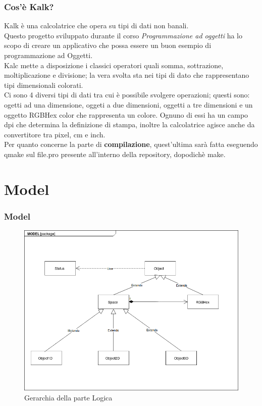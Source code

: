 \documentclass[10pt]{beamer}
\begin{document}
\begin{frame}
\frametitle{Cos'è Kalk?}
Kalk è una calcolatrice che opera su tipi di dati non banali. \\
Questo progetto sviluppato durante il corso \textit{Programmazione ad oggetti} ha lo scopo di creare un applicativo che possa essere un buon esempio di programmazione ad Oggetti. \\
Kalc mette a disposizione i classici operatori quali somma, sottrazione, moltiplicazione e divisione; la vera svolta sta nei tipi di dato che rappresentano tipi dimensionali colorati. \\
Ci sono 4 diversi tipi di dati tra cui è possibile svolgere operazioni; questi sono: ogetti ad una dimensione, oggeti a due dimensioni, oggetti a tre dimensioni e un oggetto RGBHex color che rappresenta un colore.
Ognuno di essi ha un campo dpi che determina la definizione di stampa, inoltre la calcolatrice agisce anche da convertitore tra pixel, cm e inch. \\
Per quanto concerne la parte di \textbf{compilazione}, quest'ultima sarà fatta eseguendo qmake sul file.pro presente all'interno della repository, dopodichè make.



\end{frame}

\section{Model}
\begin{frame}
\frametitle{Model}

   \FloatBarrier
   \begin{figure}[ht]
   \centering
   \includegraphics[scale=0.30]{Gerarchia.png}
   \caption{Gerarchia della parte Logica}
\end{figure}


\end{frame}
\end{document}
